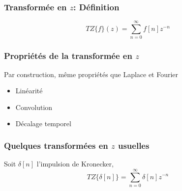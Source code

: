 \documentclass{beamer}
\begin{document}
\begin{frame}
\frametitle{Transformée en $z$: Définition}
\[TZ\{ f \}(z) = \sum_{n = 0}^{\infty} f[n] z^{-n} \]

\vspace{0.3 cm} 
\vspace{0.3 cm} 

\end{frame} 


\begin{frame}
\frametitle{Propriétés de la transformée en $z$}
Par construction, même propriétés que Laplace et Fourier\\
\vspace{0.4cm}

\begin{itemize}
\item<2-> Linéarité 
\vspace{0.3cm}
\item<4-> Convolution 
\vspace{0.3cm}
\item<6-> Décalage temporel 
\end{itemize}

\end{frame}

\begin{frame} 
\frametitle{Quelques transformées en $z$ usuelles}
Soit $\delta [n]$ l'impulsion de Kronecker,
\vspace{0.3 cm}
\[TZ\{ \delta[n] \} = \sum_{n = 0}^{\infty} \delta[n] z^{-n}\]

\vspace{0.3 cm}

\vspace{0.3 cm}
\vspace{0.4cm}

\end{frame}
\end{document}
